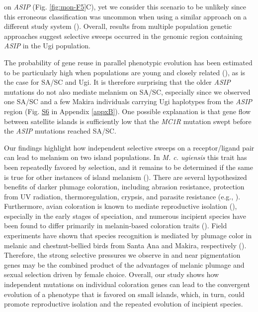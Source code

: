 on \textit{ASIP} (Fig. \ref{fig:mon-F5}C), yet we consider this scenario to be unlikely since this erroneous classification was uncommon when using a similar approach on a different study system (\cite{hejase_genomic_2020}). Overall, results from multiple population genetic approaches suggest selective sweeps occurred in the genomic region containing \textit{ASIP} in the Ugi population.

The probability of gene reuse in parallel phenotypic evolution has been estimated to be particularly high when populations are young and closely related (\cite{conte2012probability}), as is the case for \ac{SA/SC} and Ugi. It is therefore surprising that the older \textit{ASIP} mutations do not also mediate melanism on \ac{SA/SC}, especially since we observed one \ac{SA/SC} and a few Makira individuals carrying Ugi haplotypes from the \textit{ASIP} region (Fig. \href{https://journals.plos.org/PLOSGENETICS/article?id=10.1371/journal.pgen.1010474#sec017}{S6} in Appendix \ref{appxB}). One possible explanation is that gene flow between satellite islands is sufficiently low that the \textit{MC1R} mutation swept before the \textit{ASIP} mutations reached \ac{SA/SC}.

Our findings highlight how independent selective sweeps on a receptor/ligand pair can lead to melanism on two island populations. In \textit{M. c. ugiensis} this trait has been repeatedly favored by selection, and it remains to be determined if the same is true for other instances of island melanism (\cite{theron2001molecular,walsh2021patterns,uy2015island}). There are several hypothesized benefits of darker plumage coloration, including abrasion resistance, protection from UV radiation, thermoregulation, crypsis, and parasite resistance (e.g., \cite{jacquin2011melanin,marcondes2021rethinking}). Furthermore, avian coloration is known to mediate reproductive isolation (\cite{price2007speciation}), especially in the early stages of speciation, and numerous incipient species have been found to differ primarily in melanin-based coloration traits (\cite{poelstra2014genomic,uy2018behavioral,turbek_rapid_2021,semenov2021asymmetric,bourgeois2017novel}). Field experiments have shown that species recognition is mediated by plumage color in melanic and chestnut-bellied birds from Santa Ana and Makira, respectively (\cite{uy2009difference,uy2013variation}). Therefore, the strong selective pressures we observe in and near pigmentation genes may be the combined product of the advantages of melanic plumage and sexual selection driven by female choice. Overall, our study shows how independent mutations on individual coloration genes can lead to the convergent evolution of a phenotype that is favored on small islands, which, in turn, could promote reproductive isolation and the repeated evolution of incipient species.

